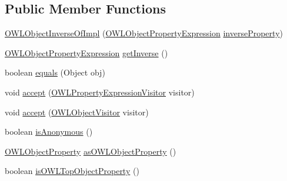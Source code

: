 \subsection*{Public Member Functions}
\begin{DoxyCompactItemize}
\item 
\hyperlink{classuk_1_1ac_1_1manchester_1_1cs_1_1owl_1_1owlapi_1_1_o_w_l_object_inverse_of_impl_a05cbcb44123221a8782ac93b1fcadced}{O\-W\-L\-Object\-Inverse\-Of\-Impl} (\hyperlink{interfaceorg_1_1semanticweb_1_1owlapi_1_1model_1_1_o_w_l_object_property_expression}{O\-W\-L\-Object\-Property\-Expression} \hyperlink{classuk_1_1ac_1_1manchester_1_1cs_1_1owl_1_1owlapi_1_1_o_w_l_object_inverse_of_impl_a868093c9a0f349a17a51723a89b39080}{inverse\-Property})
\item 
\hyperlink{interfaceorg_1_1semanticweb_1_1owlapi_1_1model_1_1_o_w_l_object_property_expression}{O\-W\-L\-Object\-Property\-Expression} \hyperlink{classuk_1_1ac_1_1manchester_1_1cs_1_1owl_1_1owlapi_1_1_o_w_l_object_inverse_of_impl_aead0e0fe96ba89881ea25eef6a97133e}{get\-Inverse} ()
\item 
boolean \hyperlink{classuk_1_1ac_1_1manchester_1_1cs_1_1owl_1_1owlapi_1_1_o_w_l_object_inverse_of_impl_a8bd7e877003b2ac911792a49228dae2e}{equals} (Object obj)
\item 
void \hyperlink{classuk_1_1ac_1_1manchester_1_1cs_1_1owl_1_1owlapi_1_1_o_w_l_object_inverse_of_impl_a92fbc1068c97de38488a316d0592c17b}{accept} (\hyperlink{interfaceorg_1_1semanticweb_1_1owlapi_1_1model_1_1_o_w_l_property_expression_visitor}{O\-W\-L\-Property\-Expression\-Visitor} visitor)
\item 
void \hyperlink{classuk_1_1ac_1_1manchester_1_1cs_1_1owl_1_1owlapi_1_1_o_w_l_object_inverse_of_impl_a71b4f0740dd31109e071aaf2127cece6}{accept} (\hyperlink{interfaceorg_1_1semanticweb_1_1owlapi_1_1model_1_1_o_w_l_object_visitor}{O\-W\-L\-Object\-Visitor} visitor)
\item 
boolean \hyperlink{classuk_1_1ac_1_1manchester_1_1cs_1_1owl_1_1owlapi_1_1_o_w_l_object_inverse_of_impl_ab146e23824c7655eaa663b37672e8b8e}{is\-Anonymous} ()
\item 
\hyperlink{interfaceorg_1_1semanticweb_1_1owlapi_1_1model_1_1_o_w_l_object_property}{O\-W\-L\-Object\-Property} \hyperlink{classuk_1_1ac_1_1manchester_1_1cs_1_1owl_1_1owlapi_1_1_o_w_l_object_inverse_of_impl_a2ed8f7c576bda06deae23d562cf91fd1}{as\-O\-W\-L\-Object\-Property} ()
\item 
boolean \hyperlink{classuk_1_1ac_1_1manchester_1_1cs_1_1owl_1_1owlapi_1_1_o_w_l_object_inverse_of_impl_a7699ad0c56048b42e1eacc48772fed29}{is\-O\-W\-L\-Top\-Object\-Property} ()

\end{DoxyCompactItemize}
